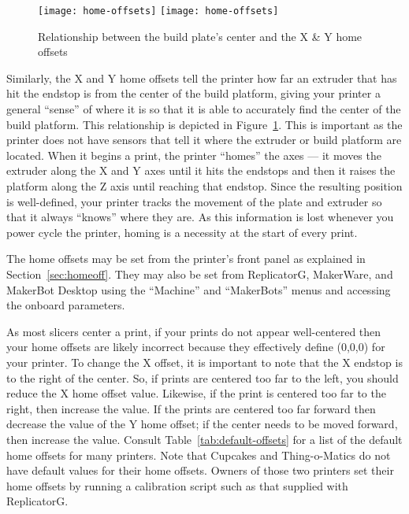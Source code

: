 \begin{figure}[!htbp]
  \centering
    \ifpdf
       \texttt{[image: home-offsets]}
    \else
       \texttt{[image: home-offsets]}
    \fi
    \caption{Relationship between the build plate's center and the X \& Y home offsets}
  \label{fig:xy-home-offsets}
\end{figure}

Similarly, the X and Y home offsets tell the printer how far an extruder that has hit the endstop is from the center of the build platform, giving your printer a general ``sense'' of where it is so that it is able to accurately find the center of the build platform.   This relationship is depicted in  Figure~\ref{fig:xy-home-offsets}. This is important as the printer does not have sensors that tell it where the extruder or build platform are located.  When it begins a print, the printer ``homes'' the axes --- it moves the extruder along the X and Y axes until it hits the endstops and then it raises the platform along the Z axis until reaching that endstop.  Since the resulting position is well-defined, your printer tracks the movement of the plate and extruder so that it always ``knows'' where they are.  As this information is lost whenever you power cycle the printer, homing is a necessity at the start of every print.

The home offsets may be set from the printer's front panel as explained in Section~\ref{sec:homeoff}.  They may also be set from ReplicatorG, MakerWare, and MakerBot Desktop using the ``Machine'' and ``MakerBots'' menus and accessing the onboard parameters.

As most \glspl{slicer} center a print, if your prints do not appear well-centered then your home offsets are likely incorrect because they effectively define (0,0,0) for your printer.   To change the X offset, it is important to note that the X endstop is to the right of the center.  So, if prints are centered too far to the left, you should reduce the X home offset value.  Likewise, if the print is centered too far to the right, then increase the value.  If the prints are centered too far forward then decrease the value of the Y home offset; if the center needs to be moved forward, then increase the value.  Consult Table~\ref{tab:default-offsets} for a list of the default home offsets for many printers.  Note that Cupcakes and Thing-o-Matics do not have default values for their home offsets.  Owners of those two printers set their home offsets by running a calibration script such as that supplied with ReplicatorG.

